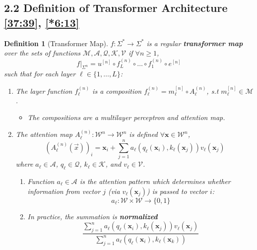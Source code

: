 \documentclass[12pt, twoside]{article}
\theoremstyle{spaceddefn}
\newtheorem{definition}{Definition}[section]
\begin{document}
\subsection*{2.2 Definition of Transformer Architecture \href{https://youtu.be/DR8bQPoRlX8?si=7ShQDJNzFFenFIuP&t=2253}{[37:39]}, \href{https://youtu.be/1u6h3Nm3NvM?si=Orlh2gRtZ3yXKfI9&t=373}{[*6:13]}}

\begin{definition}[Transformer Map] \label{def:2.4}
$f: \Sigma^* \to \Sigma^*$ is a regular \textbf{transformer map} over the sets of functions $\mathcal{M}, \mathcal{A}, \mathcal{Q}, \mathcal{K}, \mathcal{V}$ if $\forall n \ge 1$,
\[
f|_{\Sigma^n} = u^{[n]} \circ f_L^{(n)} \circ \dots \circ f_1^{(n)} \circ e^{[n]}
\]
such that for each layer $\ell \in \{1, \dots, L\}$:
\begin{enumerate}
    \item The layer function $f_\ell^{(n)}$ is a composition $f_\ell^{(n)} = m_\ell^{[n]} \circ A_\ell^{(n)}$, s.t $m_\ell^{[n]} \in \mathcal{M}$.
    \begin{itemize}
        \item The compositions are a multilayer perceptron and attention map.

    \end{itemize}

    \item The attention map $A_\ell^{(n)}: \mathcal{W}^n \to \mathcal{W}^n$ is defined $\forall \mathbf{x} \in\mathcal{W}^n$,
    \[
    (A_\ell^{(n)}(\Vec{x}))_i = \mathbf{x}_i + \sum_{j=1}^{n} a_\ell(q_\ell(\mathbf{x}_i), k_\ell(\mathbf{x}_j))v_\ell(\mathbf{x}_j)
    \]
    where $a_\ell \in \mathcal{A}$, $q_\ell \in \mathcal{Q}$, $k_\ell \in \mathcal{K}$, and $v_\ell \in \mathcal{V}$.

    \begin{enumerate}
    \item[{2.1.}] Function $a_\ell \in \mathcal{A}$ is the attention pattern which determines whether information from vector $j$ (via $v_\ell(\mathbf{x}_j)$) is passed to vector $i$:
    \[
    a_\ell: \mathcal{W} \times \mathcal{W} \to \{0, 1\}
    \]

    \item[{2.2.}] In practice, the summation is \textbf{normalized}
        \[
         \frac{\sum_{j=1}^{n}a_\ell(q_\ell(\mathbf{x}_i), k_\ell(\mathbf{x}_j))v_\ell(\mathbf{x}_j)}{\sum_{j=1}^{n} a_\ell(q_\ell(\mathbf{x}_i), k_\ell(\mathbf{x}_k))}
        \]


\end{enumerate}
\end{enumerate}
\end{definition}
\end{document}
